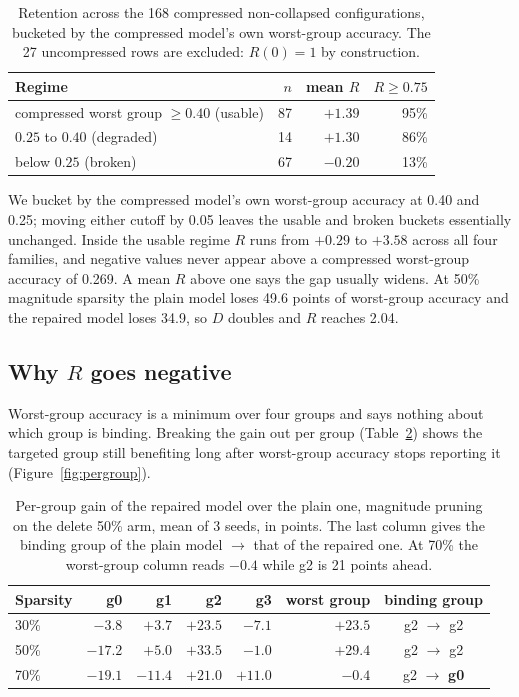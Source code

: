 \documentclass[11pt]{article}
\begin{document}
\begin{table}[t]
\centering
\small
\caption{Retention across the 168 compressed non-collapsed configurations,
bucketed by the compressed model's own worst-group accuracy. The 27
uncompressed rows are excluded: $R(0) = 1$ by construction.}
\label{tab:retention}
\begin{tabular}{@{}lrrr@{}}
\toprule
Regime & $n$ & mean $R$ & $R \geq 0.75$ \\
\midrule
compressed worst group $\geq 0.40$ (usable) & 87  & $+1.39$ & 95\% \\
$0.25$ to $0.40$ (degraded)                 & 14  & $+1.30$ & 86\% \\
below $0.25$ (broken)                       & 67  & $-0.20$ & 13\% \\
\bottomrule
\end{tabular}
\end{table}

We bucket by the compressed model's own worst-group accuracy at 0.40 and 0.25;
moving either cutoff by 0.05 leaves the usable and broken buckets essentially
unchanged. Inside the usable regime $R$ runs from $+0.29$ to $+3.58$ across all
four families, and negative values never appear above a compressed worst-group
accuracy of 0.269. A mean $R$ above one says the gap usually widens. At 50\%
magnitude sparsity the plain model loses 49.6 points of worst-group accuracy
and the repaired model loses 34.9, so $D$ doubles and $R$ reaches 2.04.

\subsection{Why $R$ goes negative}

Worst-group accuracy is a minimum over four groups and says nothing about which
group is binding. Breaking the gain out per group (Table~\ref{tab:pergroup})
shows the targeted group still benefiting long after worst-group accuracy stops
reporting it (Figure~\ref{fig:pergroup}).

\begin{table}[t]
\centering
\small
\caption{Per-group gain of the repaired model over the plain one, magnitude
pruning on the delete 50\% arm, mean of 3 seeds, in points. The last column
gives the binding group of the plain model $\rightarrow$ that of the repaired
one. At 70\% the worst-group column reads $-0.4$ while g2 is 21 points ahead.}
\label{tab:pergroup}
\begin{tabular}{@{}lrrrrrc@{}}
\toprule
Sparsity & g0 & g1 & \textbf{g2} & g3 & worst group & binding group \\
\midrule
30\% & $-3.8$  & $+3.7$  & $\mathbf{+23.5}$ & $-7.1$ & $+23.5$ & g2 $\rightarrow$ g2 \\
50\% & $-17.2$ & $+5.0$  & $\mathbf{+33.5}$ & $-1.0$ & $+29.4$ & g2 $\rightarrow$ g2 \\
70\% & $-19.1$ & $-11.4$ & $\mathbf{+21.0}$ & $+11.0$ & $-0.4$ & g2 $\rightarrow$ \textbf{g0} \\
\bottomrule
\end{tabular}
\end{table}
\end{document}

